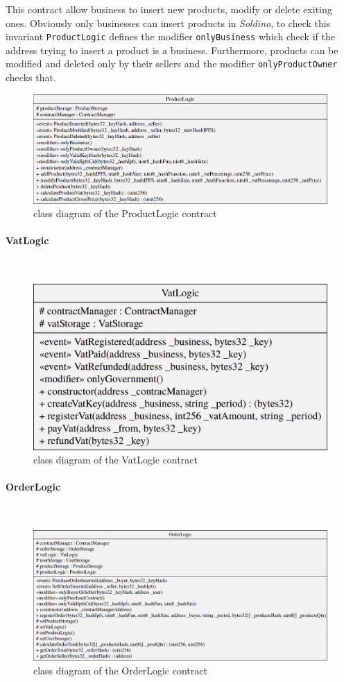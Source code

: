 \noindent This contract allow business to insert new products, modify or delete exiting ones. Obviously only businesses can insert products in \textit{Soldino}, to check this invariant \texttt{ProductLogic} defines the modifier \texttt{onlyBusiness} which check if the address trying to insert a product is a business. Furthermore, products can be modified and deleted only by their sellers and the modifier \texttt{onlyProductOwner} checks that.
\begin{figure}[H]
	\centering
	\includegraphics[scale=0.25]{res/images/solidity/productlogic.png}
	\caption{class diagram of the ProductLogic contract}
\end{figure}

\paragraph{VatLogic}\mbox{}\\

\begin{figure}[H]
	\centering
	\includegraphics[scale=0.20]{res/images/solidity/vatlogic.png}
	\caption{class diagram of the VatLogic contract}
\end{figure}

\paragraph{OrderLogic}\mbox{}\\
\begin{figure}[H]
	\centering
	\includegraphics[scale=0.25]{res/images/solidity/orderlogic.png}
	\caption{class diagram of the OrderLogic contract}
\end{figure}